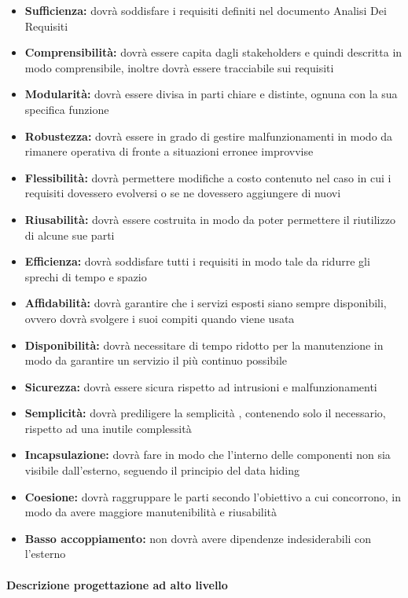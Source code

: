 \begin{itemize}
\item \textbf{Sufficienza:} dovrà  soddisfare i requisiti definiti nel documento Analisi Dei Requisiti
\item \textbf{Comprensibilità:} dovrà essere capita dagli stakeholders e quindi descritta in modo comprensibile, inoltre dovrà essere tracciabile sui requisiti
\item \textbf{Modularità:} dovrà essere divisa in parti chiare e distinte, ognuna con la sua specifica funzione
\item \textbf{Robustezza:} dovrà  essere in grado di gestire malfunzionamenti in modo da rimanere operativa di fronte a situazioni erronee improvvise
\item \textbf{Flessibilità:} dovrà  permettere modifiche a costo contenuto nel caso in cui i requisiti dovessero evolversi o se ne dovessero aggiungere di nuovi
\item \textbf{Riusabilità:} dovrà  essere costruita in modo da poter permettere il riutilizzo di alcune sue parti
\item \textbf{Efficienza:}  dovrà  soddisfare tutti i requisiti in modo tale da ridurre gli sprechi di tempo e spazio
\item \textbf{Affidabilità:}  dovrà  garantire che i servizi esposti siano sempre disponibili, ovvero dovrà svolgere i suoi compiti quando viene usata
\item \textbf{Disponibilità:} dovrà  necessitare di tempo ridotto per la manutenzione in modo da garantire un servizio il più continuo possibile
\item \textbf{Sicurezza:} dovrà  essere sicura rispetto ad intrusioni e malfunzionamenti
\item \textbf{Semplicità:} dovrà prediligere la semplicità , contenendo solo il necessario, rispetto
ad una inutile complessità 
\item \textbf{Incapsulazione:} dovrà  fare in modo che l'interno delle componenti non sia visibile
dall'esterno, seguendo il principio del data hiding
\item \textbf{Coesione:} dovrà  raggruppare le parti secondo l'obiettivo a cui concorrono, in modo
da avere maggiore manutenibilità  e riusabilità
\item \textbf{Basso accoppiamento:} non dovrà avere dipendenze indesiderabili con l'esterno
  \end{itemize}



\paragraph{Descrizione progettazione ad alto livello}

